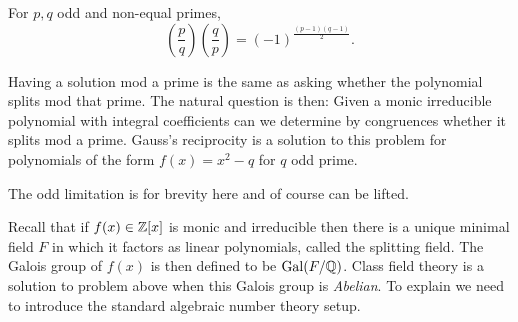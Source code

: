 \begin{Theorem}
	For \(p, q\) odd and non-equal primes,
	\[\left(\frac{p}{q}\right)\left(\frac{q}{p}\right) = (-1)^{\frac{(p-1)(q-1)}{2}}.\]
\end{Theorem}

Having a solution mod a prime is the same as asking whether the polynomial splits mod that prime. The natural question is then: Given a monic irreducible polynomial with integral coefficients can we determine by congruences whether it splits mod a prime. Gauss's reciprocity is a solution to this problem for polynomials of the form \(f(x) = x^2 - q\) for \(q\) odd prime. 
\begin{remark}
	The odd limitation is for brevity here and of course can be lifted. 
\end{remark}
Recall that if \(f(x)\in \Z[x]\) is monic and irreducible then there is a unique minimal field \(F\) in which it factors as linear polynomials, called the splitting field. The Galois group of \(f(x)\) is then defined to be \(\mathrm{Gal}(F/\Q)\). Class field theory is a solution to problem above when this Galois group is \textit{Abelian}. To explain we need to introduce the standard algebraic number theory setup.

